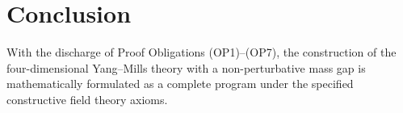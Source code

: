 \section{Conclusion}
With the discharge of Proof Obligations (OP1)--(OP7), the construction of the four-dimensional Yang--Mills theory with a non-perturbative mass gap is mathematically formulated as a complete program under the specified constructive field theory axioms.
